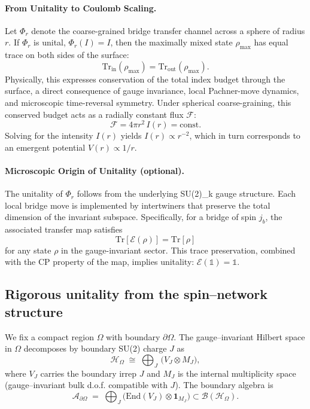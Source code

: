 \documentclass[11pt]{article}
\theoremstyle{plain}
\theoremstyle{definition}
\begin{document}
\paragraph{From Unitality to Coulomb Scaling.}
Let $\Phi_r$ denote the coarse-grained bridge transfer channel across a sphere of radius $r$.
If $\Phi_r$ is unital, $\Phi_r(I) = I$, then the maximally mixed state $\rho_{\text{max}}$ has equal trace on both sides of the surface:
\[
  \mathrm{Tr}_{\text{in}}(\rho_{\text{max}}) = \mathrm{Tr}_{\text{out}}(\rho_{\text{max}}).
\]
Physically, this expresses conservation of the total index budget through the surface, a direct consequence of gauge invariance, local Pachner-move dynamics, and microscopic time-reversal symmetry.
Under spherical coarse-graining, this conserved budget acts as a radially constant flux $\mathcal{F}$:
\[
  \mathcal{F} = 4\pi r^2 \, I(r) = \text{const}.
\]
Solving for the intensity $I(r)$ yields $I(r) \propto r^{-2}$, which in turn corresponds to an emergent potential $V(r) \propto 1/r$.

\paragraph{Microscopic Origin of Unitality (optional).}
The unitality of $\Phi_r$ follows from the underlying SU(2)_k gauge structure. Each local bridge move is implemented by intertwiners that preserve the total dimension of the invariant subspace. Specifically, for a bridge of spin $j_b$, the associated transfer map satisfies
\[
  \mathrm{Tr}[\mathcal{E}(\rho)] = \mathrm{Tr}[\rho]
\]
for any state $\rho$ in the gauge-invariant sector. This trace preservation, combined with the CP property of the map, implies unitality: $\mathcal{E}(\mathbb{1}) = \mathbb{1}$.


\subsection{Rigorous unitality from the spin–network structure}\label{sec:unitality-rigorous}

We fix a compact region $\Omega$ with boundary $\partial\Omega$.
The gauge–invariant Hilbert space in $\Omega$ decomposes by boundary SU(2) charge $J$ as
\[
  \mathcal{H}_\Omega \;\cong\; \bigoplus_{J}\, \big( V_J \otimes M_J \big),
\]
where $V_J$ carries the boundary irrep $J$ and $M_J$ is the internal multiplicity space (gauge–invariant bulk d.o.f. compatible with $J$).
The boundary algebra is
\[
  \mathcal{A}_{\partial\Omega}\;=\;\bigoplus_J \big(\mathrm{End}(V_J)\otimes \mathbf{1}_{M_J}\big)\subset \mathcal{B}(\mathcal{H}_\Omega).
\]
\end{document}

